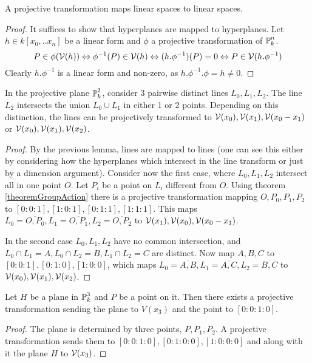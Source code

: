 \begin{lemma} \label{lemmaTransformOfLinearSpaces}
A projective transformation maps linear spaces to linear spaces.
\end{lemma}
\begin{proof}
It suffices to show that hyperplanes are mapped to hyperplanes.
Let $h \in k[x_0,..x_n]$ be a linear form and $\phi$ a projective transformation of $\operatorname{\mathbb P}^n_k$.
\begin{equation}
P \in \phi(\operatorname{\mathcal V}(h)) \Leftrightarrow \phi^{-1}(P) \in \operatorname{\mathcal V}(h) \Leftrightarrow (h.\phi^{-1})(P) = 0 \Leftrightarrow P \in \operatorname{\mathcal V}(h.\phi^{-1})
\end{equation}
Clearly $h.\phi^{-1}$ is a linear form and non-zero, as $h.\phi^{-1}.\phi = h \neq 0$.
\end{proof}


\begin{corollary} \label{corollaryDistinctLines}
In the projective plane $\operatorname{\mathbb P}^2_k$, consider 3 pairwise distinct lines $L_0,L_1,L_2$.
The line $L_2$ intersects the union $L_0 \cup L_1$ in either 1 or 2 points.
Depending on this distinction, the lines can be projectively transformed to $\operatorname{\mathcal V}(x_0),\operatorname{\mathcal V}(x_1),\operatorname{\mathcal V}(x_0-x_1)$ or $\operatorname{\mathcal V}(x_0),\operatorname{\mathcal V}(x_1),\operatorname{\mathcal V}(x_2)$.
\end{corollary}
\begin{proof}
By the previous lemma, lines are mapped to lines (one can see this either by considering how the hyperplanes which intersect in the line transform or just by a dimension argument).
Consider now the first case, where $L_0,L_1,L_2$ intersect all in one point $O$.
Let $P_i$ be a point on $L_i$ different from $O$.
Using theorem \ref{theoremGroupAction} there is a projective transformation mapping $O, P_0,P_1,P_2$ to $[0:0:1],[1:0:1],[0:1:1],[1:1:1]$.
This maps $L_0 = \overline{O,P_0}, L_1 = \overline{O,P_1}, L_2 = \overline{O,P_2}$ to $\operatorname{\mathcal V}(x_1),\operatorname{\mathcal V}(x_0),\operatorname{\mathcal V}(x_0 - x_1)$.

In the second case $L_0,L_1,L_2$ have no common intersection, and $L_0 \cap L_1 = A, L_0 \cap L_2 = B, L_1 \cap L_2 = C$ are distinct.
Now map $A,B,C$ to $[0:0:1],[0:1:0],[1:0:0]$, which maps $L_0 = \overline{A,B}, L_1=\overline{A,C}, L_2=\overline{B,C}$ to $\operatorname{\mathcal V}(x_0),\operatorname{\mathcal V}(x_1),\operatorname{\mathcal V}(x_2)$.
\end{proof}

\begin{corollary} \label{corollaryTransformPlaneWithPointOnIt}
Let $H$ be a plane in $\operatorname{\mathbb P}^3_k$ and $P$ be a point on it.
Then there exists a projective transformation sending the plane to $V(x_3)$ and the point to $[0:0:1:0]$.
\end{corollary}
\begin{proof}
The plane is determined by three points, $P, P_1,P_2$.
A projective transformation sends them to $[0:0:1:0], [0:1:0:0],[1:0:0:0]$ and along with it the plane $H$ to $\operatorname{\mathcal V}(x_3)$.
\end{proof}

